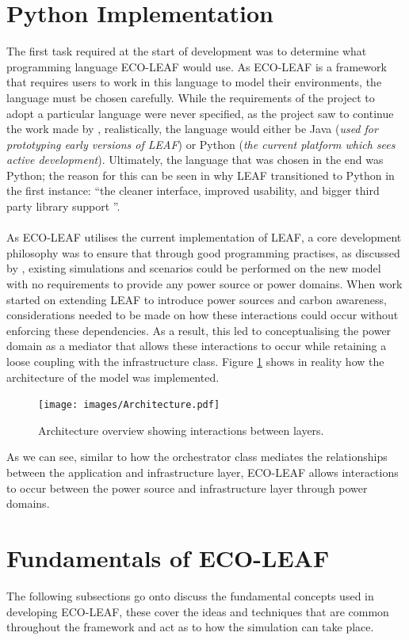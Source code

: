 \documentclass{l4proj}
\begin{document}
\section{Python Implementation}\label{sec:python}
The first task required at the start of development was to determine what programming language ECO-LEAF would use.
As ECO-LEAF is a framework that requires users to work in this language to model their environments, the language must be chosen carefully.
While the requirements of the project to adopt a particular language were never specified, as the project saw to continue the work made by \cite{leaf2021}, realistically, the language would either be Java (\textit{used for prototyping early versions of LEAF}) or Python (\textit{the current platform which sees active development}).
Ultimately, the language that was chosen in the end was Python; the reason for this can be seen in why LEAF transitioned to Python in the first instance: ``the cleaner interface, improved usability, and bigger third party library support \citep{leaf-java-git}''.\\ \\
As ECO-LEAF utilises the current implementation of LEAF, a core development philosophy was to ensure that through good programming practises, as discussed by \citep{looseCoupling}, existing simulations and scenarios could be performed on the new model with no requirements to provide any power source or power domains.
When work started on extending LEAF to introduce power sources and carbon awareness, considerations needed to be made on how these interactions could occur without enforcing these dependencies.
As a result, this led to conceptualising the power domain as a mediator that allows these interactions to occur while retaining a loose coupling with the infrastructure class.
Figure \ref{fig:archtecture} shows in reality how the architecture of the model was implemented.

\begin{figure}[h]
    \centering
    \texttt{[image: images/Architecture.pdf]}
    ~
    \caption{Architecture overview showing interactions between layers.}
    \label{fig:archtecture}
\end{figure}

As we can see, similar to how the orchestrator class mediates the relationships between the application and infrastructure layer, ECO-LEAF allows interactions to occur between the power source and infrastructure layer through power domains.

\section{Fundamentals of ECO-LEAF}
The following subsections go onto discuss the fundamental concepts used in developing ECO-LEAF, these cover the ideas and techniques that are common throughout the framework and act as to how the simulation can take place.
\end{document}
